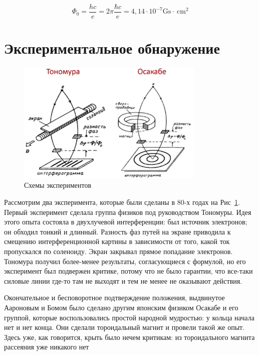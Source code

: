 \documentclass[a4paper, 14pt]{article}
\begin{document}
    \[ \Phi_0 = \frac{h c}{e} = 2 \pi \frac{\hbar c}{e} = 4,14 \cdot 10^{-7} \mathrm{Gs} \cdot \mathrm{~cm}^2 \]
    
    \section*{Экспериментальное обнаружение} 
    
    \begin{figure} [h]
        \centering
        \includegraphics[width=0.8\textwidth]{exp23}
        \caption{Схемы экспериментов}
        \label{fig:exp23}
    \end{figure}
    
    Рассмотрим два эксперимента, которые были сделаны в 80-х годах на Рис~\ref{fig:exp23}.
    Первый эксперимент сделала группа физиков под руководством Тономуры.
    Идея этого опыта состояла в двухлучевой интерференции: был источник электронов; он обходил тонкий и длинный.
    Разность фаз путей на экране приводила к смещению интерференционной картины в зависимости от того, какой ток
    пропускался по соленоиду.
    Экран закрывал прямое попадание электронов.
    Тономура получил более-менее результаты, согласующиеся с формулой, но его эксперимент был подвержен критике,
    потому что не было гарантии, что все-таки силовые линии где-то там не выходят и тем не менее не оказывают действия.
    
    Окончательное и бесповоротное подтверждение положения, выдвинутое Аароновым и Бомом было сделано другим японским
    физиком Осакабе и его группой, которые воспользовались простой народной мудростью: у кольца начала нет и нет конца.
    Они сделали тороидальный магнит и провели такой же опыт.
    Здесь уже, как говорится, крыть было нечем критикам: из тороидального магнита рассеяния уже никакого нет
    
\end{document}
